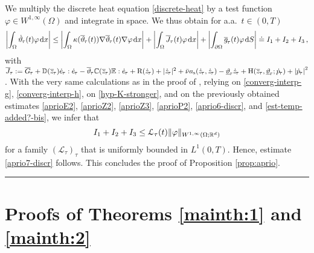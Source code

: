 \documentclass[a4paper,10pt,reqno]{amsart}
\numberwithin{equation}{section}
\newcommand{\R}{\mathbb{R}}
\numberwithin{equation}{section}
\def\dd{\;\!\mathrm{d}} %
\newcommand{\teta}{\vartheta}
\newcommand{\piecewiseConstant}[2]{\overline{#1}_{\kern-1pt#2}}
\newcommand{\pwc}{\piecewiseConstant}
\newcommand{\upiecewiseConstant}[2]{\underline{#1}_{\kern-1pt#2}}
\newcommand{\upwc}{\upiecewiseConstant}
\newcommand{\piecewiseLinear}[2]{{#1}_{\kern-1pt#2}}
\newcommand{\pwl}{\piecewiseLinear}
\newcommand{\QED}{\mbox{}\hfill\rule{5pt}{5pt}\medskip\par}
\newcommand{\bbC}{\mathbb{C}}
\newcommand{\bbD}{\mathbb{D}}
\newcommand{\bbE}{\mathbb{E}}
\newcommand{\condu}{\kappa}
\newcommand{\dip}[3]{\mathrm{H}(#1,#2;#3)}
\newcommand{\did}[1]{\mathrm{R}(#1)}
\newcommand{\ass}{a_{\mathrm{s}}}
\newcommand{\EEE}{\color{black}}
\newcommand{\MMM}{\color{black}}%
\begin{document}
We multiply the discrete heat equation \eqref{discrete-heat} by a test function  $\varphi \in W^{1,\infty}(\Omega)$ and  integrate in space.  
We thus obtain for a.a.\ $t\in (0,T)$
\begin{equation}
\label{analog-7th-est}
\left|\int_\Omega \pwl{\dot \teta}\tau (t)  \varphi \dd x \right| 
\leq \left| \int_\Omega \condu(\pwc \teta\tau(t)) \nabla  \pwc \teta\tau(t) \nabla \varphi \dd x \right| + \left| \int_\Omega \pwc J{\tau}(t) \varphi \dd x \right|
  + \left| \int_{\partial\Omega} \pwc g\tau(t)  \varphi \dd S\right| \doteq I_1+I_2+I_3\,,
\end{equation}
with 
$\pwc J{\tau}: =
   \pwc G\tau + \bbD(\pwc z\tau)   \pwl {\dot e}\tau  : \pwl {\dot e}\tau 
     -\pwc\teta\tau \bbC(\pwc z \tau) \bbE : \pwl {\dot e}\tau
     + \did{\pwl{\dot z}\tau} + |\pwl{\dot z}\tau|^2 + \bar\nu \ass (\pwl{\dot z}\tau,\pwl{\dot z}\tau)
     -\upwc \teta\tau \pwl{\dot z}\tau
    + \dip{\pwc z\tau}{\upwc\teta\tau}{ \pwl {\dot p}\tau}  +  \left|  \pwl {\dot p}\tau  \right|^2$. 
   With the very same calculations as in the proof of \cite[Prop.\ 4.10]{Rocca-Rossi}, relying on  \eqref{converg-interp-g},  
    \eqref{converg-interp-h},  on  \eqref{hyp-K-stronger}, and on the previously obtained estimates 
 \eqref{aprioE2}, \eqref{aprioZ2},  \eqref{aprioZ3}, \eqref{aprioP2},     \eqref{aprio6-discr},  and  \eqref{est-temp-added?-bis}, 
 we infer that 
 \[
I_1+I_2+I_3 \leq \calL_\tau(t) \| \varphi \|_{W^{1,\infty} (\Omega;\R^d)}
 \]
 for a family $(\mathcal{L}_\tau)_\tau$ \MMM that \EEE  is uniformly bounded in $L^1(0,T)$. 
 Hence, 
 estimate \eqref{aprio7-discr}
 follows. This concludes the proof of Proposition \ref{prop:aprio}. 
\QED


\section{\bf Proofs of Theorems \ref{mainth:1} and   \ref{mainth:2}}
\label{s:4}
\end{document}
